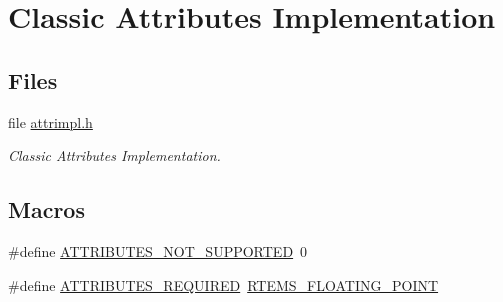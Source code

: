 \hypertarget{group__ClassicAttributesImpl}{}\section{Classic Attributes Implementation}
\label{group__ClassicAttributesImpl}
\subsection*{Files}
\begin{DoxyCompactItemize}
\item 
file \mbox{\hyperlink{attrimpl_8h}{attrimpl.\+h}}
\begin{DoxyCompactList}\small\item\em Classic Attributes Implementation. \end{DoxyCompactList}\end{DoxyCompactItemize}
\subsection*{Macros}
\begin{DoxyCompactItemize}
\item 
\#define \mbox{\hyperlink{group__ClassicAttributesImpl_gabba89e291c7bdd32056f09e569067518}{A\+T\+T\+R\+I\+B\+U\+T\+E\+S\+\_\+\+N\+O\+T\+\_\+\+S\+U\+P\+P\+O\+R\+T\+ED}}~0
\item 
\#define \mbox{\hyperlink{group__ClassicAttributesImpl_gaa314041c9f54f35f4da62deb3475deb9}{A\+T\+T\+R\+I\+B\+U\+T\+E\+S\+\_\+\+R\+E\+Q\+U\+I\+R\+ED}}~\mbox{\hyperlink{group__ClassicAttributes_gac0368fd84c0d3e0f969d72afc5126881}{R\+T\+E\+M\+S\+\_\+\+F\+L\+O\+A\+T\+I\+N\+G\+\_\+\+P\+O\+I\+NT}}
\end{DoxyCompactItemize}
